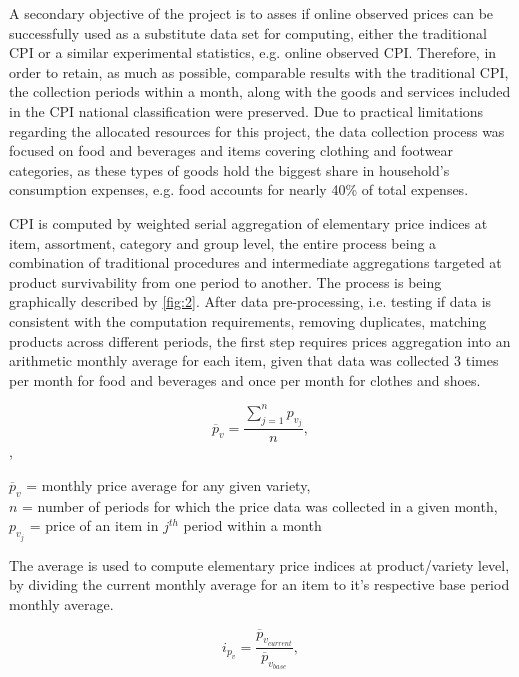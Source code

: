 \documentclass[]{article}
\begin{document}
A secondary objective of the project is to asses if online observed prices can be successfully
used as a substitute data set for computing, either the traditional CPI or a similar 
experimental statistics, e.g. online observed CPI. Therefore, in order to retain, 
as much as possible, comparable results with the traditional CPI, the collection periods 
within a month, along with the goods and services included in the CPI national classification 
were preserved. Due to practical limitations regarding the allocated resources for 
this project, the data collection process was focused on food and beverages and items 
covering clothing and footwear categories, as these types of goods hold the biggest share in 
household's consumption expenses, e.g. food accounts for nearly 40\% of total expenses\cite{hhs}. 

CPI is computed by weighted serial aggregation of elementary price indices at item, assortment, 
category and group level, the entire process being a combination of traditional procedures\cite{cpi} 
and intermediate aggregations targeted at product survivability from one period to another. 
The process is being graphically described by \ref{fig:2}. After data pre-processing, i.e. testing 
if data is consistent with the computation requirements, removing duplicates, matching 
products across different periods, the first step requires prices aggregation into an arithmetic 
monthly average for each item, given that data was collected 3 times per month for food and 
beverages and once per month for clothes and shoes. 

\begin{equation}\label{eq:1}
\overline{p}_{v} = \frac{\sum_{j=1}^n {p_{v_{j}}}}{n} ,
\end{equation} ,

\begin{center} 	
	
	$\overline{p}_{v}$ = monthly price average for any given variety, \\
	$n$ = number of periods for which the price data was collected in a given month, \\
	$p_{v_{j}}$ = price of an item in $j^{th}$ period within a month	
\end{center}

The average is used to compute elementary 
price indices at product/variety level, by dividing the current monthly average for an item to it's respective base period monthly average. 

\begin{equation}\label{eq:2}
i_{p_{v}} = \frac{\overline{p}_{v_{current}}}{\overline{p}_{v_{base}}} ,
\end{equation}
\end{document}

